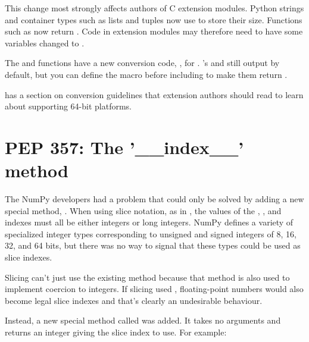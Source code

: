 \documentclass{howto}
\begin{document}
This change most strongly affects authors of C extension modules.  
Python strings and container types such as lists and tuples 
now use  to store their size.  
Functions such as  
now return .  Code in extension modules
may therefore need to have some variables changed to
.  

The  and  functions
have a new conversion code, , for .  
's  and  still output
 by default, but you can define the macro 
 before including  
to make them return .

 has a section on conversion guidelines that 
extension authors should read to learn about supporting 64-bit
platforms.

\begin{seealso}


\end{seealso}


\section{PEP 357: The '__index__' method\label{pep-357}}

The NumPy developers had a problem that could only be solved by adding
a new special method, .  When using slice notation,
as in , the values of the
, , and  indexes must all be either
integers or long integers.  NumPy defines a variety of specialized
integer types corresponding to unsigned and signed integers of 8, 16,
32, and 64 bits, but there was no way to signal that these types could
be used as slice indexes.

Slicing can't just use the existing  method because
that method is also used to implement coercion to integers.  If
slicing used , floating-point numbers would also
become legal slice indexes and that's clearly an undesirable
behaviour.

Instead, a new special method called  was added.  It
takes no arguments and returns an integer giving the slice index to
use.  For example:
\end{document}
